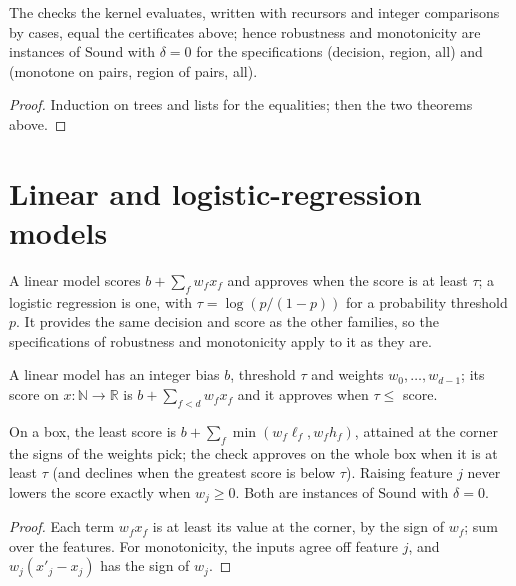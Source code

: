 \begin{theorem}\label{thm:tree_sound}
\leanok
{}
The checks the kernel evaluates, written with recursors and integer comparisons by cases, equal
the certificates above; hence robustness and monotonicity are instances of $\mathrm{Sound}$ with
$\delta = 0$ for the specifications (decision, region, all) and (monotone on pairs, region of
pairs, all).
\end{theorem}
\begin{proof}
\leanok
Induction on trees and lists for the equalities; then the two theorems above.
\end{proof}

\chapter{Linear and logistic-regression models}

A linear model scores $b + \sum_f w_f x_f$ and approves when the score is at least $\tau$; a
logistic regression \cite{hosmer2013applied} is one, with $\tau = \log(p / (1 - p))$ for a
probability threshold $p$. It provides the same decision and score as the other families, so the
specifications of robustness and monotonicity apply to it as they are.

\begin{definition}\label{def:linear_model}
\leanok
A linear model has an integer bias $b$, threshold $\tau$ and weights $w_0, \dots, w_{d-1}$; its
score on $x : \mathbb N \to \mathbb R$ is $b + \sum_{f < d} w_f x_f$ and it approves when
$\tau \le$ score.
\end{definition}

\begin{theorem}\label{thm:linear_checks}
\leanok
{}
On a box, the least score is $b + \sum_f \min(w_f \ell_f, w_f h_f)$, attained at the corner the signs
of the weights pick; the check approves on the whole box when it is at least $\tau$ (and declines
when the greatest score is below $\tau$). Raising feature $j$ never lowers the score exactly when
$w_j \ge 0$. Both are instances of $\mathrm{Sound}$ with $\delta = 0$.
\end{theorem}
\begin{proof}
\leanok
Each term $w_f x_f$ is at least its value at the corner, by the sign of $w_f$; sum over the features.
For monotonicity, the inputs agree off feature $j$, and $w_j (x'_j - x_j)$ has the sign of $w_j$.
\end{proof}

